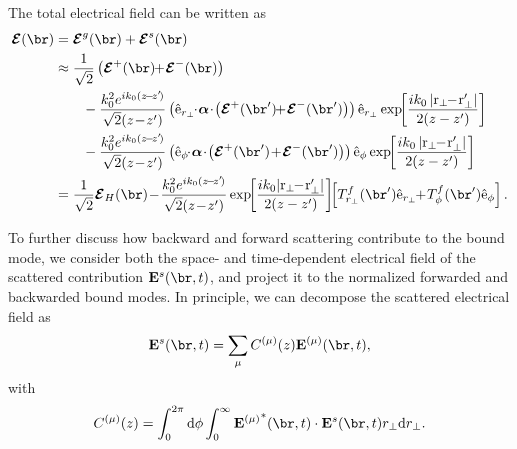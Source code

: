 \documentclass[]{report}
\begin{document}
The total electrical field can be written as 
\begin{align}
\boldsymbol{\mathcal{E}}(\br) &= \boldsymbol{\mathcal{E}}^g(\br) + \boldsymbol{\mathcal{E}}^s(\br)\\
&\approx  \frac{1}{\sqrt{2}} \left(\boldsymbol{\mathcal{E}}^+(\br)\!\! +\! \boldsymbol{\mathcal{E}}^-(\br) \right) \nonumber\\
&\qquad - \frac{k_0^2 e^{ik_0(z\!-\!z'\!)}}{\sqrt{2}(z\!-\!z')} \left(\hat{\mathrm{e}}_{r_\perp} \!\!\cdot\! \boldsymbol{\alpha}\!\cdot\! \left(\boldsymbol{\mathcal{E}}^+ (\br') \!\! +\! \boldsymbol{\mathcal{E}}^- (\br') \right)\right)\hat{\mathrm{e}}_{r_\perp}  \exp\!\! \left[ \frac{ik_0 \left| \mathrm{r}_\perp\!\! -\! \mathrm{r}_\perp'\right|}{2(z-z')}  \right] \nonumber\\
&\qquad - \frac{k_0^2 e^{ik_0(z\!-\!z'\!)}}{\sqrt{2}(z\!-\!z')} \left(\hat{\mathrm{e}}_{\phi} \!\!\cdot\! \boldsymbol{\alpha}\!\cdot\! \left(\boldsymbol{\mathcal{E}}^+ (\br') \! +\! \boldsymbol{\mathcal{E}}^- (\br') \right)\right)\hat{\mathrm{e}}_{\phi}  \exp\!\! \left[ \frac{ik_0 \left| \mathrm{r}_\perp\!\! -\! \mathrm{r}_\perp'\right|}{2(z-z')}  \right]\\
&= \frac{1}{\sqrt{2}} \boldsymbol{\mathcal{E}}_H(\br)  \!-\! \frac{k_0^2 e^{ik_0(z\!-\!z'\!)}}{\sqrt{2}(z\!-\!z')} \exp\!\! \left[ \frac{ik_0\! \left| \mathrm{r}_\perp\!\! -\! \mathrm{r}_\perp'\right|}{2(z-z')}  \right]\!\! \left[ T^f_{r_\perp}(\br') \hat{\mathrm{e}}_{r_\perp} \!\! +\! T^f_\phi (\br') \hat{\mathrm{e}}_{\phi} \right].
\end{align}

To further discuss how backward and forward scattering contribute to the bound mode, we consider both the space- and time-dependent electrical field of the scattered contribution $ \mathbf{E}^s(\br,t) $, and project it to the normalized forwarded and backwarded bound modes.  In principle, we can decompose the scattered electrical field as 
\begin{align}
\mathbf{E}^s(\br,t) =\sum_\mu C^{(\mu)}(z) \mathbf{E}^{(\mu)} (\br,t),
\end{align}
with
\begin{align}
C^{(\mu)} (z) = \int_0^{2\pi}\mathrm{d}\phi \int_0^\infty {\mathbf{E}^{(\mu)}}^* (\br,t) \cdot \mathbf{E}^s(\br,t)r_\perp \mathrm{d}r_\perp.
\end{align}
\end{document}
